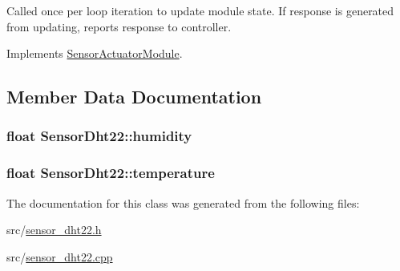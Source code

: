 Called once per loop iteration to update module state. If response is generated from updating, reports response to controller. 



Implements \hyperlink{class_sensor_actuator_module_adf93ff40fbdfeecbb8711ea0626fe6fc}{Sensor\+Actuator\+Module}.



\subsection{Member Data Documentation}
\hypertarget{class_sensor_dht22_a93f9363f3086e00f440fc89a7f1f8a1b}{}
\subsubsection[{humidity}]{\setlength{\rightskip}{0pt plus 5cm}float Sensor\+Dht22\+::humidity}\label{class_sensor_dht22_a93f9363f3086e00f440fc89a7f1f8a1b}
\hypertarget{class_sensor_dht22_af35665067c66e887afa5fef5611fb48a}{}
\subsubsection[{temperature}]{\setlength{\rightskip}{0pt plus 5cm}float Sensor\+Dht22\+::temperature}\label{class_sensor_dht22_af35665067c66e887afa5fef5611fb48a}


The documentation for this class was generated from the following files\+:\begin{DoxyCompactItemize}
\item 
src/\hyperlink{sensor__dht22_8h}{sensor\+\_\+dht22.\+h}\item 
src/\hyperlink{sensor__dht22_8cpp}{sensor\+\_\+dht22.\+cpp}\end{DoxyCompactItemize}
